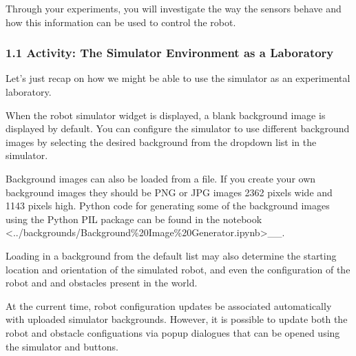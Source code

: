 \documentclass[letterpaper,10pt,english]{sphinxmanual}
\begin{document}
Through your experiments, you will investigate the way the sensors behave and how this information can be used to control the robot.


\subsubsection{1.1 Activity: The Simulator Environment as a Laboratory}
\label{\detokenize{content/04_Robot_Lab/Section_00_01:1.1-Activity:-The-Simulator-Environment-as-a-Laboratory}}
Let’s just recap on how we might be able to use the simulator as an experimental laboratory.

When the robot simulator widget is displayed, a blank background image is displayed by default. You can configure the simulator to use different background images by selecting the desired background from the dropdown list in the simulator.

Background images can also be loaded from a file. If you create your own background images they should be PNG or JPG images 2362 pixels wide and 1143 pixels high. Python code for generating some of the background images using the Python PIL package can be found in the notebook  \textless{}../backgrounds/Background\%20Image\%20Generator.ipynb\textgreater{}\textasciigrave{}\_\_.

Loading in a background from the default list may also determine the starting location and orientation of the simulated robot, and even the configuration of the robot and and obstacles present in the world.

At the current time, robot configuration updates  be associated automatically with uploaded simulator backgrounds. However, it is possible to update both the robot and obstacle configuations via pop\sphinxhyphen{}up dialogues that can be opened using the simulator  and  buttons.
\end{document}
